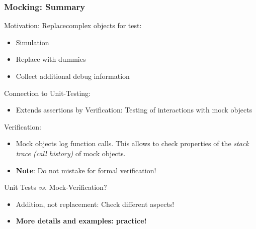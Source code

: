 \begin{frame}
 \frametitle{Mocking: Summary}
 
Motivation: \glqq Replace\grqq complex objects for test:
\begin{itemize}
  \item Simulation
  \item Replace with dummies
  \item Collect additional debug information
\end{itemize}
Connection to Unit-Testing:
\begin{itemize}
  \item Extends assertions by Verification: Testing of interactions with mock objects
\end{itemize}
Verification:
\begin{itemize}
  \item Mock objects log function calls. This allows to check properties of the \textit{stack trace (call history)} of mock objects.
  \item \textbf{Note}: Do not mistake for formal verification!
\end{itemize}
Unit Tests \textit{vs.} Mock-Verification?
\begin{itemize}
  \item Addition, not replacement: Check different aspects!
  \item \textbf{More details and examples: practice!}
\end{itemize}
\end{frame}
